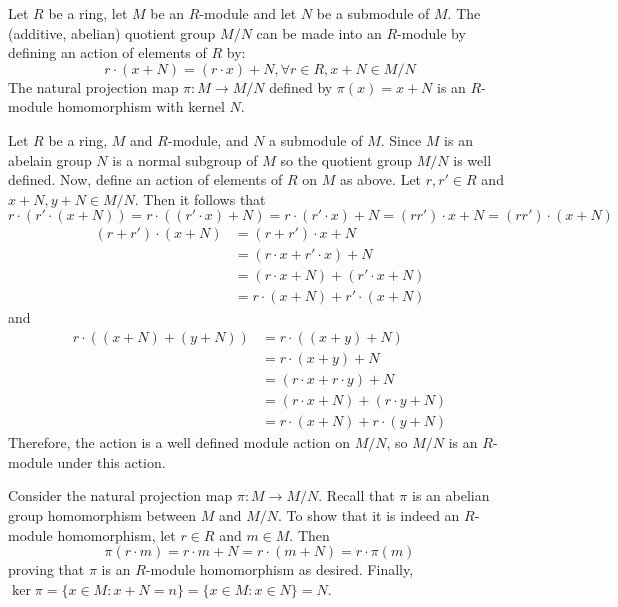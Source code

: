 \documentclass[12pt, a4paper, twoside, openright, titlepage]{book}
\begin{document}
\begin{prop}{}{}
    Let $R$ be a ring, let $M$ be an $R$-module and let $N$ be a submodule of $M$. The (additive, abelian) quotient group $M/N$ can be made into an $R$-module by defining an action of elements of $R$ by: \begin{equation*}
        r\cdot(x+N) = (r\cdot x)+N,\forall r \in R, x+N \in M/N
    \end{equation*}
    The natural projection map $\pi:M\rightarrow M/N$ defined by $\pi(x) = x+N$ is an $R$-module homomorphism with kernel $N$.
\end{prop}
\begin{proof*}{}{}
    Let $R$ be a ring, $M$ and $R$-module, and $N$ a submodule of $M$. Since $M$ is an abelain group $N$ is a normal subgroup of $M$ so the quotient group $M/N$ is well defined. Now, define an action of elements of $R$ on $M$ as above. Let $r,r' \in R$ and $x+N,y+N \in M/N$. Then it follows that \begin{equation*}
        r\cdot(r'\cdot(x+N)) = r\cdot((r'\cdot x)+N) = r\cdot(r'\cdot x)+N = (rr')\cdot x + N = (rr')\cdot(x+N)
    \end{equation*}
    \begin{align*}
        (r+r')\cdot(x+N) &= (r+r')\cdot x+N \\
        &= (r\cdot x + r'\cdot x)+N \\
        &= (r\cdot x + N) + (r'\cdot x + N) \\
        &= r\cdot(x+N)+r'\cdot(x+N)
    \end{align*}
    and \begin{align*}
        r\cdot ((x+N)+(y+N)) &= r\cdot((x+y)+N) \\
        &= r\cdot(x+y)+N \\
        &= (r\cdot x + r\cdot y) + N\\
        &= (r\cdot x + N) + (r\cdot y +N) \\
        &= r\cdot (x+N) +r\cdot (y+N)
    \end{align*}
    Therefore, the action is a well defined module action on $M/N$, so $M/N$ is an $R$-module under this action.

    Consider the natural projection map $\pi:M\rightarrow M/N$. Recall that $\pi$ is an abelian group homomorphism between $M$ and $M/N$. To show that it is indeed an $R$-module homomorphism, let $r \in R$ and $m \in M$. Then \begin{equation*}
        \pi(r\cdot m) = r\cdot m + N = r\cdot(m+N) = r\cdot \pi(m)
    \end{equation*}
    proving that $\pi$ is an $R$-module homomorphism as desired. Finally, $\ker\pi = \{x \in M:x+N = n\} = \{x\in M:x \in N\} = N$.
\end{proof*}
\end{document}
